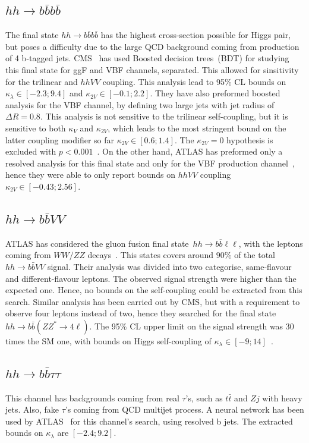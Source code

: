 \subsection*{$hh \to b\bar b b \bar b $}
 The final state $ hh \to b\bar b b \bar b$ has the highest cross-section possible for Higgs pair, but poses a difficulty due to the large QCD background  coming from production of 4 b-tagged jets. CMS~\cite{CMS-PAS-HIG-20-005} has used Boosted decision trees~(BDT) for studying this final state for ggF and VBF channels, separated. This allowed for sinsitivity for the trilinear and $hhVV$ coupling. This analysis lead to 95\% CL bounds on $\kappa_\lambda \in [-2.3;9.4]$ and $\kappa_{2V} \in [-0.1; 2.2]$.  They have also preformed boosted analysis for the VBF channel, by defining two large jets with jet radius of $\Delta R =0.8$. This analysis is not sensitive to the trilinear self-coupling, but it is sensitive to both $\kappa_V$ and  $\kappa_{2V} $, which leads to the most stringent bound on the latter coupling modifier so far  $\kappa_{2V}  \in [0.6;1.4]$. The $\kappa_{2V}=0$ hypothesis is excluded with $ p<0.001$~\cite{CMS-PAS-B2G-21-001}. On the other hand, ATLAS has preformed only a resolved analysis for this final state and only for the VBF production channel~\cite{ATLAS:2020jgy}, hence they were able to only report bounds on $hhVV$ coupling $\kappa_{2V} \in [-0.43;2.56]$. 
\subsection*{$hh \to b\bar b VV $}
ATLAS has considered the gluon fusion final state~$hh \to b\bar b \ell \ell$, with the leptons coming from $WW/ZZ$ decays~\cite{ATLAS:2019vwv}. This states covers around $90\%$ of the total~$hh \to b\bar b VV $ signal. Their analysis was divided into two categorise, same-flavour and different-flavour leptons. The observed signal strength were higher than the expected one. Hence, no bounds on the self-coupling could be extracted from this search. Similar analysis has been carried out by CMS, but with a requirement to observe four leptons instead of two, hence they searched for the final state$hh \to b\bar b( ZZ^*\to 4\ell)$. The 95\% CL upper limit on the signal strength was 30 times the SM one, with bounds on Higgs self-coupling of $\kappa_\lambda \in [-9;14]$~\cite{CMS-PAS-HIG-20-004}. 
\subsection*{$hh \to b\bar b \tau \tau $}
This channel has backgrounds coming from real $\tau$'s, such as $t\bar t$ and $Z j$ with heavy jets. Also, fake $\tau$'s coming from QCD multijet process. A neural network has been used by ATLAS~\cite{ATLAS-CONF-2021-052} for this channel's search, using resolved b jets. The extracted bounds on $\kappa_\lambda$ are $[-2.4;9.2]$. 
